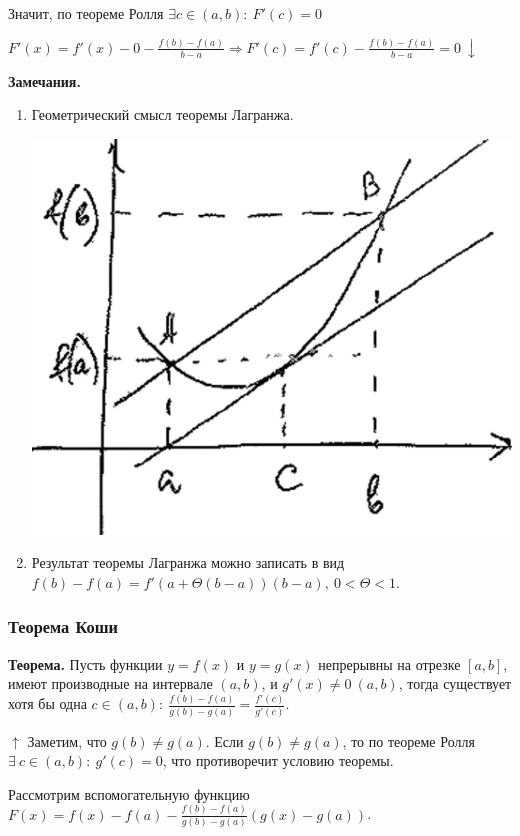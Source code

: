 \documentclass{article}
\begin{document}
Значит, по теореме Ролля \(\exists c \in (a, b):\ F'(c) = 0\)

\(F'(x) = f'(x) - 0 - \frac{f(b) - f(a)}{b - a} \Rightarrow F'(c) = f'(c) - \frac{f(b) - f(a)}{b - a} = 0\ \downarrow\)

\textbf{Замечания.}
\begin{enumerate}
    \item Геометрический смысл теоремы Лагранжа.
    
    \includegraphics[scale=0.15]{11_1_10_1.png}
    \item Результат теоремы Лагранжа можно записать в вид \(f(b) - f(a) = f'(a + \Theta(b-a))(b-a),\ 0 < \Theta < 1\).
\end{enumerate}

\subsubsection{Теорема Коши}

\textbf{Теорема.} Пусть функции \(y = f(x)\) и \(y = g(x)\) непрерывны на отрезке \([a, b]\), имеют производные на интервале \((a, b)\), и \(g'(x) \neq 0\ (a,b)\), тогда существует хотя бы одна \(c \in (a,b):\ \frac{f(b) - f(a)}{g(b) - g(a)} = \frac{f'(c)}{g'(c)}\).

\(\uparrow\) Заметим, что \(g(b) \neq g(a)\). Если \(g(b) \neq g(a)\), то по теореме Ролля \(\exists\ c \in (a, b):\ g'(c) = 0\), что противоречит условию теоремы.

Рассмотрим вспомогательную функцию \(F(x) = f(x) - f(a) - \frac{f(b) - f(a)}{g(b) - g(a)}(g(x) - g(a))\).
\end{document}
